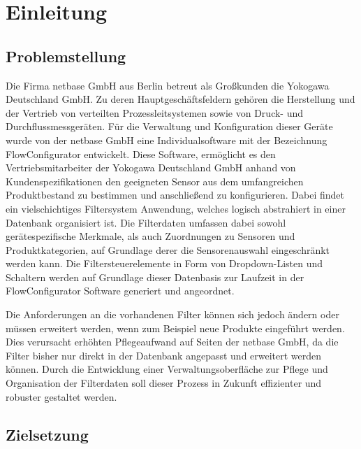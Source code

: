 \chapter{Einleitung}
\label{cha:Einleitung}

\section{Problemstellung}
\label{sec:Problemstellung}

Die Firma netbase GmbH aus Berlin betreut als Großkunden die Yokogawa Deutschland GmbH. Zu deren Hauptgeschäftsfeldern gehören die Herstellung und der Vertrieb von verteilten Prozessleitsystemen sowie von Druck- und Durchflussmessgeräten. Für die Verwaltung und Konfiguration dieser Geräte wurde von der netbase GmbH eine Individualsoftware mit der Bezeichnung FlowConfigurator entwickelt. Diese Software, ermöglicht es den Vertriebsmitarbeiter der Yokogawa Deutschland GmbH anhand von Kundenspezifikationen den geeigneten Sensor aus dem umfangreichen Produktbestand zu bestimmen und anschließend zu konfigurieren. Dabei findet ein vielschichtiges Filtersystem Anwendung, welches logisch abstrahiert in einer Datenbank organisiert ist. Die Filterdaten umfassen dabei sowohl gerätespezifische Merkmale, als auch Zuordnungen zu Sensoren und Produktkategorien, auf Grundlage derer die Sensorenauswahl eingeschränkt werden kann. Die Filtersteuerelemente in Form von Dropdown-Listen und Schaltern werden auf Grundlage dieser Datenbasis zur Laufzeit in der FlowConfigurator Software generiert und angeordnet. 

Die Anforderungen an die vorhandenen Filter können sich jedoch ändern oder müssen erweitert werden, wenn zum Beispiel neue Produkte eingeführt werden. Dies verursacht erhöhten Pflegeaufwand auf Seiten der netbase GmbH, da die Filter bisher nur direkt in der Datenbank angepasst und erweitert werden können. Durch die Entwicklung einer Verwaltungsoberfläche zur Pflege und Organisation der Filterdaten soll dieser Prozess in Zukunft effizienter und robuster gestaltet werden.

\newpage

\section{Zielsetzung}
\label{sec:Zielsetzung}


